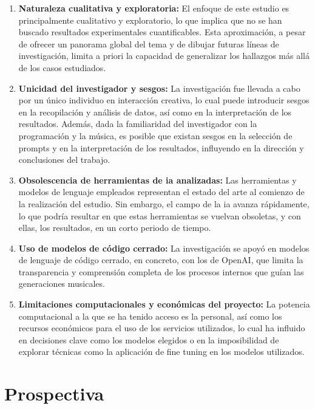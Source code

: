 \begin{enumerate}
    
\item \textbf{Naturaleza cualitativa y exploratoria:} El enfoque de este estudio es principalmente cualitativo y exploratorio, lo que implica que no se han buscado resultados experimentales cuantificables. Esta aproximación, a pesar de ofrecer un panorama global del tema y de dibujar futuras líneas de investigación, limita a priori la capacidad de generalizar los hallazgos más allá de los casos estudiados.

\item \textbf{Unicidad del investigador y sesgos:} La investigación fue llevada a cabo por un único individuo en interacción creativa, lo cual puede introducir sesgos en la recopilación y análisis de datos, así como en la interpretación de los resultados. Además, dada la familiaridad del investigador con la programación y la música, es posible que existan sesgos en la selección de prompts y en la interpretación de los resultados, influyendo en la dirección y conclusiones del trabajo.

\item \textbf{Obsolescencia de herramientas de \gls{ia} analizadas:} Las herramientas y modelos de lenguaje empleados representan el estado del arte al comienzo de la realización del estudio. Sin embargo, el campo de la \gls{ia} avanza rápidamente, lo que podría resultar en que estas herramientas se vuelvan obsoletas, y con ellas, los resultados, en un corto periodo de tiempo.

\item \textbf{Uso de modelos de código cerrado:} La investigación se apoyó en modelos de lenguaje de código cerrado, en concreto, con los de OpenAI, que limita la transparencia y comprensión completa de los procesos internos que guían las generaciones musicales.

\item \textbf{Limitaciones computacionales y económicas del proyecto:} La potencia computacional a la que se ha tenido acceso es la personal, así como los recursos económicos para el uso de los servicios utilizados, lo cual ha influido en decisiones clave como los modelos elegidos o en la imposibilidad de explorar técnicas como la aplicación de fine tuning en los modelos utilizados.
\end{enumerate}


\section{Prospectiva}


